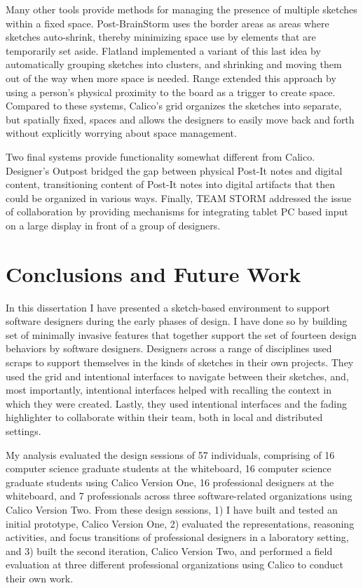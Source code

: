 \documentclass[12pt,fleqn]{ucithesis}
\begin{document}
Many other tools provide methods for managing the presence of multiple sketches within a fixed space. Post-BrainStorm \citep{guimbretiere2001fluid} uses the border areas as areas where sketches auto-shrink, thereby minimizing space use by elements that are temporarily set aside. Flatland \citep{mynatt1999flatland} implemented a variant of this last idea by automatically grouping sketches into clusters, and shrinking and moving them out of the way when more space is needed. Range \citep{Ju} extended this approach by using a person's physical proximity to the board as a trigger to create space. Compared to these systems, Calico's grid organizes the sketches into separate, but spatially fixed, spaces and allows the designers to easily move back and forth without explicitly worrying about space management.

Two final systems provide functionality somewhat different from Calico. Designer's Outpost \citep{klemmer2001designers} bridged the gap between physical Post-It notes and digital content, transitioning content of Post-It notes into digital artifacts that then could be organized in various ways. Finally, TEAM STORM \citep{Hailpern} addressed the issue of collaboration by providing mechanisms for integrating tablet PC based input on a large display in front of a group of designers. 

 \newpage 
 \newpage \chapter{Conclusions and Future Work}
\label{chapter:conclusions}


In this dissertation I have presented a sketch-based environment to support software designers during the early phases of design. I have done so by building set of minimally invasive features that together support the set of fourteen design behaviors by software designers. Designers across a range of disciplines used scraps to support themselves in the kinds of sketches in their own projects. They used the grid and intentional interfaces to navigate between their sketches, and, most importantly, intentional interfaces helped with recalling the context in which they were created. Lastly, they used intentional interfaces and the fading highlighter to collaborate within their team, both in local and distributed settings.

My analysis evaluated the design sessions of 57 individuals, comprising of 16 computer science graduate students at the whiteboard, 16 computer science graduate students using Calico Version One, 16 professional designers at the whiteboard, and 7 professionals across three software-related organizations using Calico Version Two. From these design sessions, 1) I have built and tested an initial prototype, Calico Version One, 2) evaluated the representations, reasoning activities, and focus transitions of professional designers in a laboratory setting, and 3) built the second iteration, Calico Version Two, and performed a field evaluation at three different professional organizations using Calico to conduct their own work.
\end{document}
